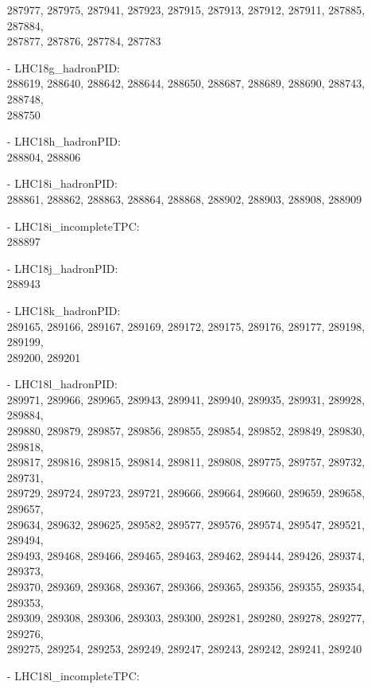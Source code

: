 \begin{appendix}
\begin{itemize}
     287977, 287975, 287941, 287923, 287915, 287913, 287912, 287911, 287885, 287884,\\
     287877, 287876, 287784, 287783
    \item[-] LHC18g\_hadronPID:\\[1pt]
     288619, 288640, 288642, 288644, 288650, 288687, 288689, 288690, 288743, 288748,\\
     288750
    \item[-] LHC18h\_hadronPID:\\[1pt]
     288804, 288806
    \item[-] LHC18i\_hadronPID:\\[1pt]
     288861, 288862, 288863, 288864, 288868, 288902, 288903, 288908, 288909
    \item[-] LHC18i\_incompleteTPC:\\[1pt]
     288897 
    \item[-] LHC18j\_hadronPID:\\[1pt]
     288943
    \item[-] LHC18k\_hadronPID:\\[1pt]
     289165, 289166, 289167, 289169, 289172, 289175, 289176, 289177, 289198, 289199,\\
     289200, 289201 
    \item[-] LHC18l\_hadronPID:\\[1pt]
     289971, 289966, 289965, 289943, 289941, 289940, 289935, 289931, 289928, 289884,\\
     289880, 289879, 289857, 289856, 289855, 289854, 289852, 289849, 289830, 289818,\\
     289817, 289816, 289815, 289814, 289811, 289808, 289775, 289757, 289732, 289731,\\
     289729, 289724, 289723, 289721, 289666, 289664, 289660, 289659, 289658, 289657,\\
     289634, 289632, 289625, 289582, 289577, 289576, 289574, 289547, 289521, 289494,\\
     289493, 289468, 289466, 289465, 289463, 289462, 289444, 289426, 289374, 289373,\\
     289370, 289369, 289368, 289367, 289366, 289365, 289356, 289355, 289354, 289353,\\
     289309, 289308, 289306, 289303, 289300, 289281, 289280, 289278, 289277, 289276,\\
     289275, 289254, 289253, 289249, 289247, 289243, 289242, 289241, 289240
    \item[-] LHC18l\_incompleteTPC:\\[1pt]

\end{itemize}
\end{appendix}
